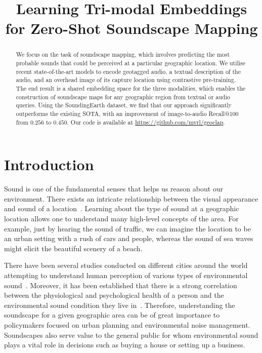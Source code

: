 \documentclass{bmvc2k}
\title{Learning Tri-modal Embeddings for Zero-Shot Soundscape Mapping}
\begin{document}
\maketitle

\begin{abstract}
We focus on the task of soundscape mapping, which involves predicting the most probable sounds that could be perceived at a particular geographic location. We utilise recent state-of-the-art models to encode geotagged audio, a textual description of the audio, and an overhead image of its capture location using contrastive pre-training. The end result is a shared embedding space for the three modalities, which enables the construction of soundscape maps for any geographic region from textual or audio queries. Using the SoundingEarth dataset, we find that our approach significantly outperforms the existing SOTA, with an improvement of image-to-audio Recall@100 from $0.256$ to $0.450$. Our code is available at \url{https://github.com/mvrl/geoclap}.
\end{abstract}

\section{Introduction}
\label{sec:intro}









Sound is one of the fundamental senses that helps us reason about our environment. There exists an intricate relationship between the visual appearance and sound of a location~\cite{gonzalez2023effects,garzon2023relationships}. Learning about the type of sound at a geographic location allows one to understand many high-level concepts of the area. For example, just by hearing the sound of traffic, we can imagine the location to be an urban setting with a rush of cars and people, whereas the sound of sea waves might elicit the beautiful scenery of a beach. 

There have been several studies conducted on different cities around the world attempting to understand human perception of various types of environmental sound~\cite{aramaki2023image,garzon2023relationships,ooi2023araus,picaut2019open,lionello2020systematic,aiello2016chatty}. Moreover, it has been established that there is a strong correlation between the physiological and psychological health of a person and the environmental sound condition they live in~\cite{lercher2023soundscape,cui2022research,radicchi2021sound}. Therefore, understanding the soundscape for a given geographic area can be of great importance to policymakers focused on urban planning and environmental noise management. Soundscapes also serve value to the general public for whom environmental sound plays a vital role in decisions such as buying a house or setting up a business.
\end{document}
